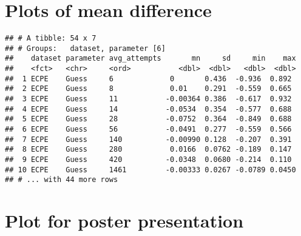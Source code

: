\documentclass[]{article}
\newenvironment{Shaded}{\begin{snugshade}}{\end{snugshade}}
\newcommand{\DataTypeTok}[1]{\textcolor[rgb]{0.13,0.29,0.53}{#1}}
\newcommand{\KeywordTok}[1]{\textcolor[rgb]{0.13,0.29,0.53}{\textbf{#1}}}
\newcommand{\NormalTok}[1]{#1}
\newcommand{\OperatorTok}[1]{\textcolor[rgb]{0.81,0.36,0.00}{\textbf{#1}}}
\newcommand{\StringTok}[1]{\textcolor[rgb]{0.31,0.60,0.02}{#1}}
\begin{document}
\hypertarget{plots-of-mean-difference}{%
\section{Plots of mean difference}\label{plots-of-mean-difference}}

\begin{Shaded}
\end{Shaded}

\begin{verbatim}
## # A tibble: 54 x 7
## # Groups:   dataset, parameter [6]
##    dataset parameter avg_attempts       mn     sd     min    max
##    <fct>   <chr>     <ord>           <dbl>  <dbl>   <dbl>  <dbl>
##  1 ECPE    Guess     6             0       0.436  -0.936  0.892 
##  2 ECPE    Guess     8             0.01    0.291  -0.559  0.665 
##  3 ECPE    Guess     11           -0.00364 0.386  -0.617  0.932 
##  4 ECPE    Guess     14           -0.0534  0.354  -0.577  0.688 
##  5 ECPE    Guess     28           -0.0752  0.364  -0.849  0.688 
##  6 ECPE    Guess     56           -0.0491  0.277  -0.559  0.566 
##  7 ECPE    Guess     140          -0.00990 0.128  -0.207  0.391 
##  8 ECPE    Guess     280           0.0166  0.0762 -0.189  0.147 
##  9 ECPE    Guess     420          -0.0348  0.0680 -0.214  0.110 
## 10 ECPE    Guess     1461         -0.00333 0.0267 -0.0789 0.0450
## # ... with 44 more rows
\end{verbatim}

\hypertarget{plot-for-poster-presentation}{%
\section{Plot for poster
presentation}\label{plot-for-poster-presentation}}
\end{document}
